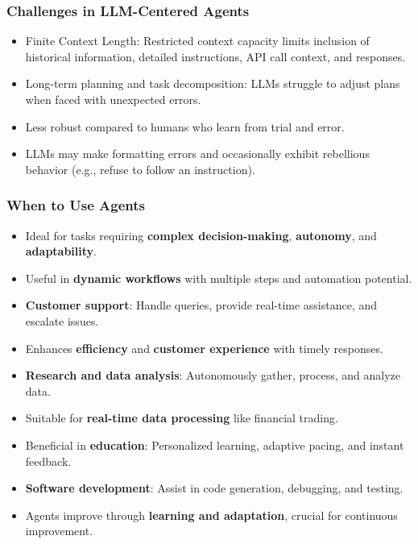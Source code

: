 \begin{frame}[fragile]\frametitle{Challenges in LLM-Centered Agents}
  \begin{itemize}

    \item Finite Context Length: Restricted context capacity limits inclusion of historical information, detailed instructions, API call context, and responses.
    \item Long-term planning and task decomposition: LLMs struggle to adjust plans when faced with unexpected errors.
    \item Less robust compared to humans who learn from trial and error.
    \item LLMs may make formatting errors and occasionally exhibit rebellious behavior (e.g., refuse to follow an instruction).
  \end{itemize}
\end{frame}

\begin{frame}[fragile]\frametitle{When to Use Agents}
\begin{itemize}
    \item Ideal for tasks requiring \textbf{complex decision-making}, \textbf{autonomy}, and \textbf{adaptability}.
    \item Useful in \textbf{dynamic workflows} with multiple steps and automation potential.
    \item \textbf{Customer support}: Handle queries, provide real-time assistance, and escalate issues.
    \item Enhances \textbf{efficiency} and \textbf{customer experience} with timely responses.
    \item \textbf{Research and data analysis}: Autonomously gather, process, and analyze data.
    \item Suitable for \textbf{real-time data processing} like financial trading.
    \item Beneficial in \textbf{education}: Personalized learning, adaptive pacing, and instant feedback.
    \item \textbf{Software development}: Assist in code generation, debugging, and testing.
    \item Agents improve through \textbf{learning and adaptation}, crucial for continuous improvement.
\end{itemize}
\end{frame}

